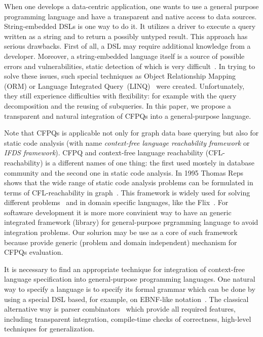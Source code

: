 When one develops a data-centric application, one wants to use a general purpose programming language and have a transparent and native access to data sources.
String-embedded DSLs is one way to do it. 
It utilizes a driver to execute a query written as a string and to return a possibly untyped result. 
This approach has serious drawbacks.
First of all, a DSL may require additional knowledge from a developer.
Moreover, a string-embedded language itself is a source of possible errors and vulnerabilities, static detection of which is very difficult~\cite{stringEmbeddedLanguagesProblem}.  
In trying to solve these issues, such special techniques as Object Relationship Mapping (ORM) or Language Integrated Query~(LINQ)~\cite{LINQ1, LINQ2, LinqRDF} were created. Unfortunately, they still experience difficulties with flexibility: for example with the query decomposition and the reusing of subqueries.
In this paper, we propose a transparent and natural integration of CFPQs into a general-purpose language. 

Note that CFPQs is applicable not only for graph data base querying but also for static code analysis (with name \emph{context-free language reachability framework} or  \emph{IFDS framework}).
CFPQ and context-free language reachability (CFL-reachability) is a different names of one thing: the first used mostely in database community and the second one in static code analysis.
In 1995 Thomas Reps shows that the wide range of static code analysis problems can be formulated in terms of CFL-reachability in graph~\cite{Reps:1995, Reps}.
This framework is widely used for solving different problems~\cite{JavaCFL, Zheng, LabelFlowCFLReachability, CFLfinding, CFLTaint, CFLGraspan} and in domain specific languages, like the Flix~\cite{Flix}.
For softaware development it is more more convinient way to have an generic integrated framework (library) for general-purpose prgramming language to avoid integration problems.
Our solurion may be use as a core of such framework because provide generic (problem and domain independent) mechanism for CFPQs evaluation.

It is necessary to find an appropriate technique for integration of context-free language specification into general-purpose programming languages.
One natural way to specify a language is to specify its formal grammar which can be done by using a special DSL based, for example, on EBNF-like notation~\cite{EBNFISO}.
The classical alternative way is parser combinators~\cite{MonadicPArserCombinators} which provide all required features, including transparent integration, compile-time checks of correctness, high-level techniques for generalization.

